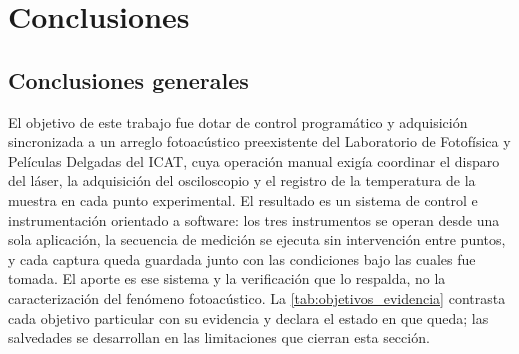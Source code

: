\chapter{Conclusiones}
\label{cap:conclusiones}

\section{Conclusiones generales}
\label{sec:conclusiones_generales}

El objetivo de este trabajo fue dotar de control programático y
adquisición sincronizada a un arreglo fotoacústico preexistente del
Laboratorio de Fotofísica y Películas Delgadas del ICAT, cuya operación
manual exigía coordinar el disparo del láser, la adquisición del
osciloscopio y el registro de la temperatura de la muestra en cada
punto experimental. El resultado es un sistema de control e
instrumentación orientado a software: los tres instrumentos se operan
desde una sola aplicación, la secuencia de medición se ejecuta sin
intervención entre puntos, y cada captura queda guardada junto con las
condiciones bajo las cuales fue tomada. El aporte es ese sistema y la
verificación que lo respalda, no la caracterización del fenómeno
fotoacústico. La \cref{tab:objetivos_evidencia} contrasta cada objetivo
particular con su evidencia y declara el estado en que queda; las
salvedades se desarrollan en las limitaciones que cierran esta sección.

